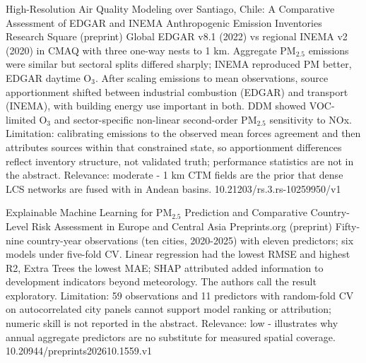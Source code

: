 \documentclass[10pt]{article}
\begin{document}
{High-Resolution Air Quality Modeling over Santiago, Chile: A Comparative Assessment of EDGAR and INEMA Anthropogenic Emission Inventories}
{Research Square (preprint)}
{Global EDGAR v8.1 (2022) vs regional INEMA v2 (2020) in CMAQ with three one-way nests to 1 km. Aggregate PM$_{2.5}$ emissions were similar but sectoral splits differed sharply; INEMA reproduced PM better, EDGAR daytime O$_3$. After scaling emissions to mean observations, source apportionment shifted between industrial combustion (EDGAR) and transport (INEMA), with building energy use important in both. DDM showed VOC-limited O$_3$ and sector-specific non-linear second-order PM$_{2.5}$ sensitivity to NOx. Limitation: calibrating emissions to the observed mean forces agreement and then attributes sources within that constrained state, so apportionment differences reflect inventory structure, not validated truth; performance statistics are not in the abstract. Relevance: moderate - 1 km CTM fields are the prior that dense LCS networks are fused with in Andean basins.}
{10.21203/rs.3.rs-10259950/v1}

{Explainable Machine Learning for PM$_{2.5}$ Prediction and Comparative Country-Level Risk Assessment in Europe and Central Asia}
{Preprints.org (preprint)}
{Fifty-nine country-year observations (ten cities, 2020-2025) with eleven predictors; six models under five-fold CV. Linear regression had the lowest RMSE and highest R2, Extra Trees the lowest MAE; SHAP attributed added information to development indicators beyond meteorology. The authors call the result exploratory. Limitation: 59 observations and 11 predictors with random-fold CV on autocorrelated city panels cannot support model ranking or attribution; numeric skill is not reported in the abstract. Relevance: low - illustrates why annual aggregate predictors are no substitute for measured spatial coverage.}
{10.20944/preprints202610.1559.v1}

\par{}\baselineskip{}\baselineskip
{}
\end{document}
